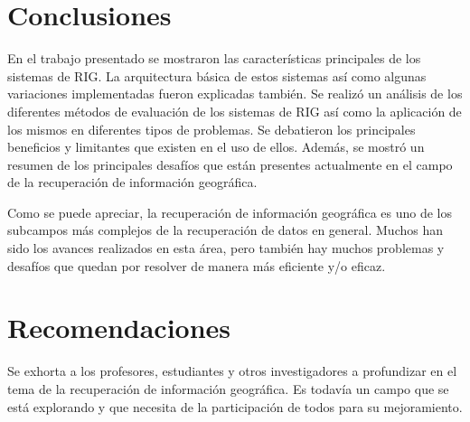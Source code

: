 \documentclass{llncs}
\begin{document}
\section{Conclusiones}\label{sec:conclusions}

En el trabajo presentado se mostraron las características principales de los
sistemas de RIG. La arquitectura básica de estos sistemas así como algunas
variaciones implementadas fueron explicadas también. Se realizó un análisis de
los diferentes métodos de evaluación de los sistemas de RIG así como la
aplicación de los mismos en diferentes tipos de problemas. Se debatieron los
principales beneficios y limitantes que existen en el uso de ellos.
Además, se mostró un resumen de los principales desafíos que están presentes
actualmente en el campo de la recuperación de información geográfica.

Como se puede apreciar, la recuperación de información geográfica es uno de los
subcampos más complejos de la recuperación de datos en general. Muchos han sido
los avances realizados en esta área, pero también hay muchos problemas y
desafíos que quedan por resolver de manera más eficiente y/o eficaz.


\section{Recomendaciones}\label{sec:recomend}

Se exhorta a los profesores, estudiantes y otros investigadores a profundizar
en el tema de la recuperación de información geográfica. Es todavía un
campo que se está explorando y que necesita de la participación de todos
para su mejoramiento.
\end{document}
